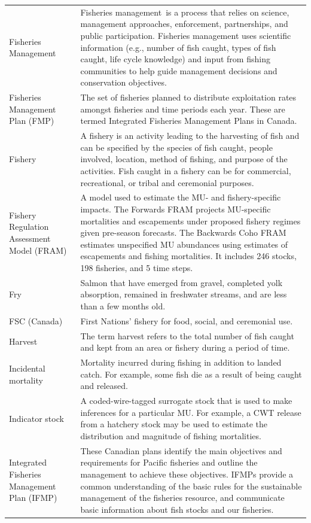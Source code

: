 \documentclass[
  letterpaper,
  DIV=11,
  numbers=noendperiod]{scrartcl}
\begin{document}
\begin{table}
\begin{tabular*}{\linewidth}{@{\extracolsep{\fill}}ll}
Fisheries Management & Fisheries management is a process that relies on science, management approaches, enforcement, partnerships, and public participation. Fisheries management uses scientific information (e.g., number of fish caught, types of fish caught, life cycle knowledge) and input from fishing communities to help guide management decisions and conservation objectives. \\ 
Fisheries Management Plan (FMP) & The set of fisheries planned to distribute exploitation rates amongst fisheries and time periods each year. These are termed Integrated Fisheries Management Plans in Canada. \\ 
Fishery & A fishery is an activity leading to the harvesting of fish and can be specified by the species of fish caught, people involved, location, method of fishing, and purpose of the activities. Fish caught in a fishery can be for commercial, recreational, or tribal and ceremonial purposes. \\ 
Fishery Regulation Assessment Model (FRAM) & A model used to estimate the MU- and fishery-specific impacts. The Forwards FRAM projects MU-specific mortalities and escapements under proposed fishery regimes given pre-season forecasts. The Backwards Coho FRAM estimates unspecified MU abundances using estimates of escapements and fishing mortalities. It includes 246 stocks, 198 fisheries, and 5 time steps. \\ 
Fry & Salmon that have emerged from gravel, completed yolk absorption, remained in freshwater streams, and are less than a few months old. \\ 
FSC (Canada) & First Nations' fishery for food, social, and ceremonial use. \\ 
Harvest & The term harvest refers to the total number of fish caught and kept from an area or fishery during a period of time. \\ 
Incidental mortality & Mortality incurred during fishing  in addition to landed catch. For example, some fish die as a result of being caught and released. \\ 
Indicator stock & A coded-wire-tagged surrogate stock that is used to make inferences for a particular MU. For example, a CWT release from a hatchery stock may be used to estimate the distribution and magnitude of fishing mortalities. \\ 
Integrated Fisheries Management Plan (IFMP) & These Canadian plans identify the main objectives and requirements for Pacific fisheries and outline the management to achieve these objectives. IFMPs provide a common understanding of the basic rules for the sustainable management of the fisheries resource, and communicate basic information about fish stocks and our fisheries. \\ 

\end{tabular*}
\end{table}
\end{document}
